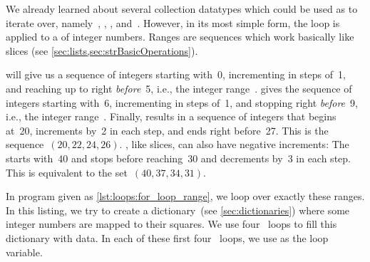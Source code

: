 We already learned about several collection datatypes which could be used as  to iterate over, namely~, , , and~.
However, in its most simple form, the  loop is applied to a  of integer numbers.
Ranges are sequences which work basically like slices (see \cref{sec:lists,sec:strBasicOperations}).

 will give us a sequence of integers starting with~0, incrementing in steps of~1, and reaching up to right \emph{before}~5, i.e., the integer range~.
 gives the sequence of integers starting with~6, incrementing in steps of~1, and stopping right \emph{before}~9, i.e., the integer range~.
Finally,  results in a sequence of integers that begins at~20, increments by~2 in each step, and ends right before~27.
This is the sequence~$(20, 22, 24, 26)$.
, like slices, can also have negative increments:
The  starts with~40 and stops before reaching~30 and decrements by~3 in each step.
This is equivalent to the set~$(40, 37, 34, 31)$.

In program  given as \cref{lst:loops:for_loop_range}, we loop over exactly these ranges.
In this listing, we try to create a dictionary~(see \cref{sec:dictionaries}) where some integer numbers are mapped to their squares.
We use four ~loops to fill this dictionary with data.
In each of these first four ~loops, we use  as the loop variable.

